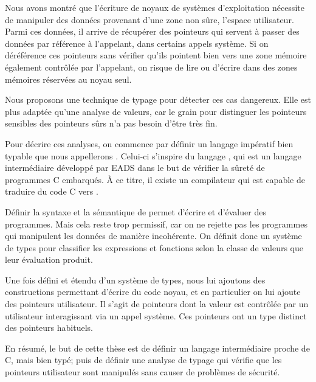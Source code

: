 Nous avons montré que l'écriture de noyaux de systèmes d'exploitation nécessite
de manipuler des données provenant d'une zone non sûre, l'espace utilisateur.
Parmi ces données, il arrive de récupérer des pointeurs qui servent à passer des
données par référence à l'appelant, dans certains appels système. Si on
déréférence ces pointeurs sans vérifier qu'ils pointent bien vers une zone
mémoire également contrôlée par l'appelant, on risque de lire ou d'écrire dans
des zones mémoires réservées au noyau seul.

Nous proposons une technique de typage pour détecter ces cas dangereux. Elle est
plus adaptée qu'une analyse de valeurs, car le grain pour distinguer les
pointeurs sensibles des pointeurs sûrs n'a pas besoin d'être très fin.

Pour décrire ces analyses, on commence par définir un langage impératif bien
typable que nous appellerons \langname.
Celui-ci s'inspire du langage \newspeak, qui est un langage intermédiaire
développé par EADS dans le but de vérifier la sûreté de programmes C embarqués.
À ce titre, il existe un compilateur qui est capable de traduire du code C vers
\newspeak.

Définir la syntaxe et la sémantique de \langname permet d'écrire et d'évaluer
des programmes. Mais cela reste trop permissif, car on ne rejette pas les
programmes qui manipulent les données de manière incohérente. On définit donc un
système de types pour classifier les expressions et fonctions selon la classe de
valeurs que leur évaluation produit.

Une fois \langname défini et étendu d'un système de types, nous lui ajoutons des
constructions permettant d'écrire du code noyau, et en particulier on lui ajoute
des pointeurs utilisateur. Il s'agit de pointeurs dont la valeur est contrôlée
par un utilisateur interagissant via un appel système. Ces pointeurs ont un type
distinct des pointeurs habituels.

En résumé, le but de cette thèse est de définir un langage intermédiaire proche
de C, mais bien typé; puis de définir une analyse de typage qui vérifie que les
pointeurs utilisateur sont manipulés sans causer de problèmes de sécurité.

